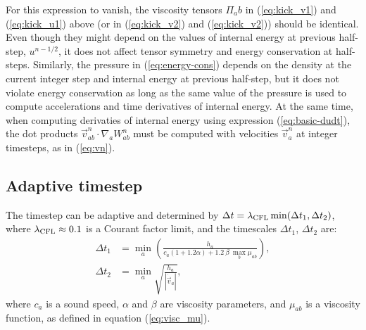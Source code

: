 \documentclass[notes.tex]{subfiles}
\begin{document}
For this expression to vanish, the viscosity tensors $\Pi_ab$ in
(\ref{eq:kick_v1}) and (\ref{eq:kick_u1}) above (or in (\ref{eq:kick_v2}) and
(\ref{eq:kick_v2})) should be identical. Even though they might depend on the
values of internal energy at previous half-step, $u^{n-1/2}$, it does not
affect tensor symmetry and energy conservation at half-steps.
Similarly, the pressure in (\ref{eq:energy-cons}) depends on the density at
the current integer step and internal energy at previous half-step, but it
does not violate energy conservation as long as the same value of the pressure
is used to compute accelerations and time derivatives of internal energy.
At the same time, when computing derivaties of internal energy using
expression (\ref{eq:basic-dudt}), the dot products 
$\vec{v}^{n}_{ab}\cdot\nabla_a W^n_{ab}$ must be computed with velocities
$\vec{v}^{n}_a$ at integer timesteps, as in (\ref{eq:vn}).

\subsection{Adaptive timestep}

The timestep can be adaptive and determined by
$\Delta t = \lambda_{\rm CFL}\min(\Delta t_1,\Delta t_2)$, where
$\lambda_{\rm CFL}\approx0.1$ is a Courant factor limit, and the timescales
$\Delta t_1$, $\Delta t_2$ are:
\begin{align}
  \Delta t_1 &= \min_a\left(\frac{h_a}{c_a(1 + 1.2\alpha)
                                      + 1.2\ \beta\ \max_b\mu_{ab}}\right), \\
  \Delta t_2 &= \min_a\sqrt{\frac{h_a}{|\dot\vec{v}_a|}},
\end{align}
where $c_a$ is a sound speed, $\alpha$ and $\beta$ are viscosity parameters,
and $\mu_{ab}$ is a viscosity function, as defined in equation (\ref{eq:visc_mu}).
\end{document}

